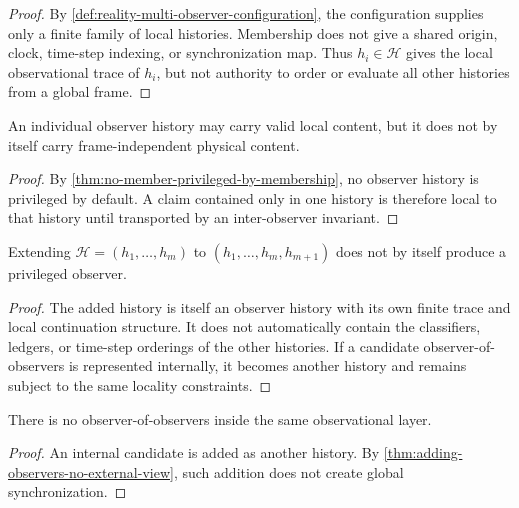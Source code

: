 \begin{proof}
By \autoref{def:reality-multi-observer-configuration}, the configuration supplies only a finite family of local histories. Membership does not give a shared origin, clock, time-step indexing, or synchronization map. Thus $h_i\in\mathcal H$ gives the local observational trace of $h_i$, but not authority to order or evaluate all other histories from a global frame.
\end{proof}

\begin{corollary}
\label{cor:single-history-not-frame-independent-carrier}
An individual observer history may carry valid local content, but it does not by itself carry frame-independent physical content.
\end{corollary}

\begin{proof}
By \autoref{thm:no-member-privileged-by-membership}, no observer history is privileged by default. A claim contained only in one history is therefore local to that history until transported by an inter-observer invariant.
\end{proof}

\begin{theorem}
\label{thm:adding-observers-no-external-view}
Extending $\mathcal H=(h_1,\ldots,h_m)$ to $(h_1,\ldots,h_m,h_{m+1})$ does not by itself produce a privileged observer.
\end{theorem}

\begin{proof}
The added history is itself an observer history with its own finite trace and local continuation structure. It does not automatically contain the classifiers, ledgers, or time-step orderings of the other histories. If a candidate observer-of-observers is represented internally, it becomes another history and remains subject to the same locality constraints.
\end{proof}

\begin{corollary}
\label{cor:no-internal-observer-of-observers}
There is no observer-of-observers inside the same observational layer.
\end{corollary}

\begin{proof}
An internal candidate is added as another history. By \autoref{thm:adding-observers-no-external-view}, such addition does not create global synchronization.
\end{proof}

